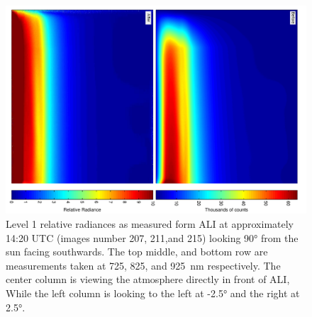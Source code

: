 \documentclass[12pt]{article}
\begin{document}
\newpage

\begin{figure}
\includegraphics[width=1.0\textwidth, angle=90]{./Images/BeforeAfterImage.pdf}
    \caption{Level 1 relative radiances as measured form ALI at approximately 14:20 UTC (images number 207, 211,and 215) looking 90\si{\degree} from the sun facing southwards. The top middle, and bottom row are measurements taken at 725, 825, and 925~nm respectively. The center column is viewing the atmosphere directly in front of ALI, While the left column is looking to the left at -2.5\si{\degree} and the right at 2.5\si{\degree}. }
    \label{fig:BeforeAfterImages}
\end{figure}

\newpage
\end{document}
